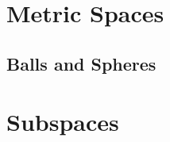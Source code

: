 \documentclass{book}
\begin{document}
\section{Metric Spaces} 
 
 
\subsection{Balls and Spheres}
 
 
 
 
 
 
 
 
 
 
 


\section{Subspaces}

 
 


\end{document}
